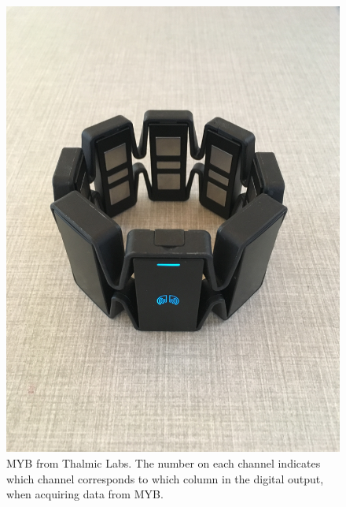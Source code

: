 \begin{figure}[H]                 
	\includegraphics[width=.4\textwidth]{figures/xBackground/myoband}  
	\caption{MYB from Thalmic Labs. The number on each channel indicates which channel corresponds to which column in the digital output, when acquiring data from MYB.}
	\label{fig:myoarmband} 
\end{figure}